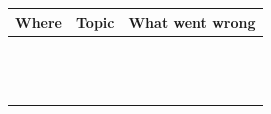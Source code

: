 \documentclass[11pt]{article}
\begin{document}
\newpage

\begin{tabularx}{\textwidth}{
  >{\raggedright\arraybackslash}p{2.6cm}
  >{\raggedright\arraybackslash}p{3.2cm}
  X
}
\textbf{Where} & \textbf{Topic} & \textbf{What went wrong} \\
\hline
\\[-0.4em]

\underline{\hspace{2.4cm}} &
\underline{\hspace{3.0cm}} &
\underline{\hspace{9.3cm}}\\
\underline{\hspace{2.4cm}} & &
\underline{\hspace{9.3cm}}\\
\underline{\hspace{2.4cm}} & &
\underline{\hspace{9.3cm}}\\[0.5em]

\underline{\hspace{2.4cm}} &
\underline{\hspace{3.0cm}} &
\underline{\hspace{9.3cm}}\\
\underline{\hspace{2.4cm}} & &
\underline{\hspace{9.3cm}}\\
\underline{\hspace{2.4cm}} & &
\underline{\hspace{9.3cm}}\\[0.5em]

\underline{\hspace{2.4cm}} &
\underline{\hspace{3.0cm}} &
\underline{\hspace{9.3cm}}\\
\underline{\hspace{2.4cm}} & &
\underline{\hspace{9.3cm}}\\
\underline{\hspace{2.4cm}} & &
\underline{\hspace{9.3cm}}\\[0.5em]

\underline{\hspace{2.4cm}} &
\underline{\hspace{3.0cm}} &
\underline{\hspace{9.3cm}}\\
\underline{\hspace{2.4cm}} & &
\underline{\hspace{9.3cm}}\\
\underline{\hspace{2.4cm}} & &
\underline{\hspace{9.3cm}}\\[0.5em]


\end{tabularx}
\end{document}
